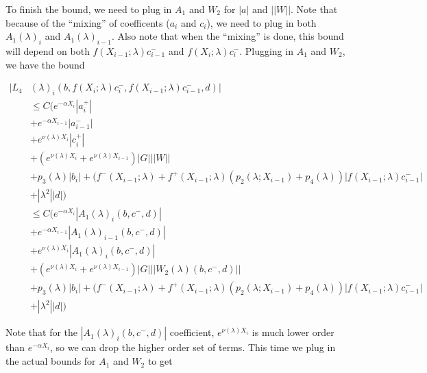 \documentclass[12pt]{article}
\begin{document}
\begin{enumerate}
To finish the bound, we need to plug in $A_1$ and $W_2$ for $|a|$ and $||W||$. Note that because of the ``mixing'' of coefficents ($a_i$ and $c_i$), we need to plug in both $A_1(\lambda)_i$ and $A_1(\lambda)_{i-1}$. Also note that when the ``mixing'' is done, this bound will depend on both $f(X_{i-1}; \lambda) c_{i-1}^-$ and $f(X_i; \lambda) c_i^-$. Plugging in $A_1$ and $W_2$, we have the bound

\begin{align*}
|L_4&(\lambda)_i(b, f(X_i; \lambda) c_i^-, f(X_{i-1}; \lambda) c_{i-1}^-, d)|\\ 
&\leq C\Big( e^{-\alpha X_i} |a_i^+| \\
&+  e^{-\alpha X_{i-1}} |a_{i-1}^-| \\
&+ e^{\nu(\lambda)X_{i}} |c_i^+| \\
&+ (e^{\nu(\lambda)X_i} + e^{\nu(\lambda)X_{i-1}}) |G| ||W|| \\
&+ p_3(\lambda) |b_i| + (f^-(X_{i-1}; \lambda) + f^+(X_{i-1}; \lambda) (p_2(\lambda; X_{i-1}) + p_4(\lambda)) | f(X_{i-1}; \lambda) c_{i-1}^-| \\
&+|\lambda^2| |d| \Big) \\
&\leq C\Big( e^{-\alpha X_i} |A_1(\lambda)_i(b, c^-, d)| \\
&+  e^{-\alpha X_{i-1}} |A_1(\lambda)_{i-1}(b, c^-, d)| \\
&+ e^{\nu(\lambda)X_{i}} |A_1(\lambda)_i(b, c^-, d)|  \\
&+ (e^{\nu(\lambda)X_i} + e^{\nu(\lambda)X_{i-1}}) |G| ||W_2(\lambda)(b,c^-,d)|| \\
&+ p_3(\lambda) |b_i| + (f^-(X_{i-1}; \lambda) + f^+(X_{i-1}; \lambda) (p_2(\lambda; X_{i-1}) + p_4(\lambda)) | f(X_{i-1}; \lambda) c_{i-1}^-| \\
&+|\lambda^2| |d| \Big)
\end{align*}

Note that for the $|A_1(\lambda)_i(b, c^-, d)|$ coefficient, $e^{\nu(\lambda)X_{i}}$ is much lower order than $e^{-\alpha X_i}$, so we can drop the higher order set of terms. This time we plug in the actual bounds for $A_1$ and $W_2$ to get


\end{enumerate}
\end{document}
